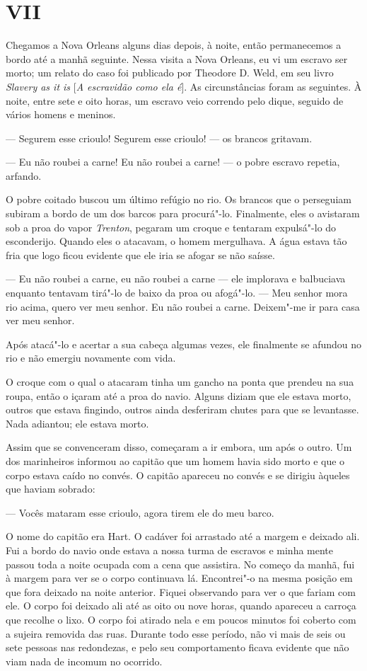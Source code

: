\chapter{VII}

Chegamos a Nova Orleans alguns dias depois, à noite, então permanecemos
a bordo até a manhã seguinte. Nessa visita a Nova Orleans, eu vi um
escravo ser morto; um relato do caso foi publicado por Theodore D. Weld,
em seu livro \emph{Slavery as it is} {[}\emph{A escravidão como ela
é}{]}. As circunstâncias foram as seguintes. À noite, entre sete e oito
horas, um escravo veio correndo pelo dique, seguido de vários homens e
meninos.

--- Segurem esse crioulo! Segurem esse crioulo! --- os brancos gritavam.

--- Eu não roubei a carne! Eu não roubei a carne! --- o pobre escravo
repetia, arfando.

O pobre coitado buscou um último refúgio no rio. Os brancos que o
perseguiam subiram a bordo de um dos barcos para procurá"-lo. Finalmente,
eles o avistaram sob a proa do vapor \emph{Trenton}, pegaram um croque e
tentaram expulsá"-lo do esconderijo. Quando eles o atacavam, o homem
mergulhava. A água estava tão fria que logo ficou evidente que ele iria
se afogar se não saísse.

--- Eu não roubei a carne, eu não roubei a carne --- ele implorava e
balbuciava enquanto tentavam tirá"-lo de baixo da proa ou afogá"-lo. ---
Meu senhor mora rio acima, quero ver meu senhor. Eu não roubei a carne.
Deixem"-me ir para casa ver meu senhor.

Após atacá"-lo e acertar a sua cabeça algumas vezes, ele finalmente se
afundou no rio e não emergiu novamente com vida.

O croque com o qual o atacaram tinha um gancho na ponta que prendeu na
sua roupa, então o içaram até a proa do navio. Alguns diziam que ele
estava morto, outros que estava fingindo, outros ainda desferiram chutes
para que se levantasse. Nada adiantou; ele estava morto.

Assim que se convenceram disso, começaram a ir embora, um após o outro.
Um dos marinheiros informou ao capitão que um homem havia sido morto e
que o corpo estava caído no convés. O capitão apareceu no convés e se
dirigiu àqueles que haviam sobrado:

--- Vocês mataram esse crioulo, agora tirem ele do meu barco.

O nome do capitão era Hart. O cadáver foi arrastado até a margem e
deixado ali. Fui a bordo do navio onde estava a nossa turma de escravos
e minha mente passou toda a noite ocupada com a cena que assistira. No
começo da manhã, fui à margem para ver se o corpo continuava lá.
Encontrei"-o na mesma posição em que fora deixado na noite anterior.
Fiquei observando para ver o que fariam com ele. O corpo foi deixado ali
até as oito ou nove horas, quando apareceu a carroça que recolhe o lixo.
O corpo foi atirado nela e em poucos minutos foi coberto com a sujeira
removida das ruas. Durante todo esse período, não vi mais de seis ou
sete pessoas nas redondezas, e pelo seu comportamento ficava evidente
que não viam nada de incomum no ocorrido.


